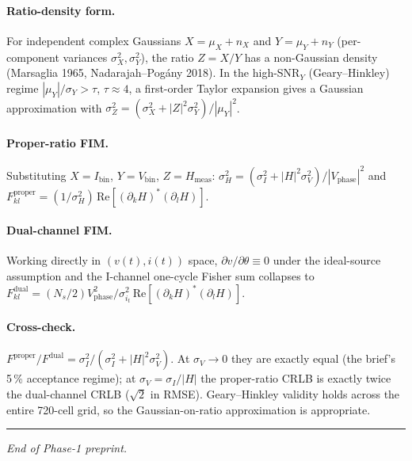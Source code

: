 \documentclass[11pt,a4paper]{article}
\begin{document}
\paragraph{Ratio-density form.}  For independent complex Gaussians
$X = \mu_X + n_X$ and $Y = \mu_Y + n_Y$ (per-component variances
$\sigma_X^2, \sigma_Y^2$), the ratio $Z = X/Y$ has a non-Gaussian
density (Marsaglia 1965, Nadarajah--Pog\'any 2018).  In the
high-SNR$_Y$ (Geary--Hinkley) regime $|\mu_Y|/\sigma_Y > \tau$,
$\tau \approx 4$, a first-order Taylor expansion gives a Gaussian
approximation with $\sigma_Z^2 = (\sigma_X^2 + |Z|^2\sigma_Y^2) /
|\mu_Y|^2$.

\paragraph{Proper-ratio FIM.}  Substituting $X = I_{\mathrm{bin}}$,
$Y = V_{\mathrm{bin}}$, $Z = H_{\mathrm{meas}}$:
$\sigma_H^2 = (\sigma_I^2 + |H|^2 \sigma_V^2) / |V_{\mathrm{phase}}|^2$
and $F^{\mathrm{proper}}_{kl} = (1/\sigma_H^2)\,\mathrm{Re}[(\partial_k
H)^*(\partial_l H)]$.

\paragraph{Dual-channel FIM.}  Working directly in $(v(t), i(t))$
space, $\partial v/\partial\theta \equiv 0$ under the ideal-source
assumption and the I-channel one-cycle Fisher sum collapses to
$F^{\mathrm{dual}}_{kl} = (N_s/2) V_{\mathrm{phase}}^2 / \sigma_{i_t}^2
\,\mathrm{Re}[(\partial_k H)^*(\partial_l H)]$.

\paragraph{Cross-check.}  $F^{\mathrm{proper}}/F^{\mathrm{dual}} =
\sigma_I^2/(\sigma_I^2 + |H|^2 \sigma_V^2)$.  At $\sigma_V\to 0$
they are exactly equal (the brief's 5\,\% acceptance regime); at
$\sigma_V = \sigma_I/|H|$ the proper-ratio CRLB is exactly twice the
dual-channel CRLB ($\sqrt 2$ in RMSE).  Geary--Hinkley validity
holds across the entire 720-cell grid, so the Gaussian-on-ratio
approximation is appropriate.

\bigskip\hrule\bigskip
\noindent\textit{End of Phase-1 preprint.}
\end{document}
